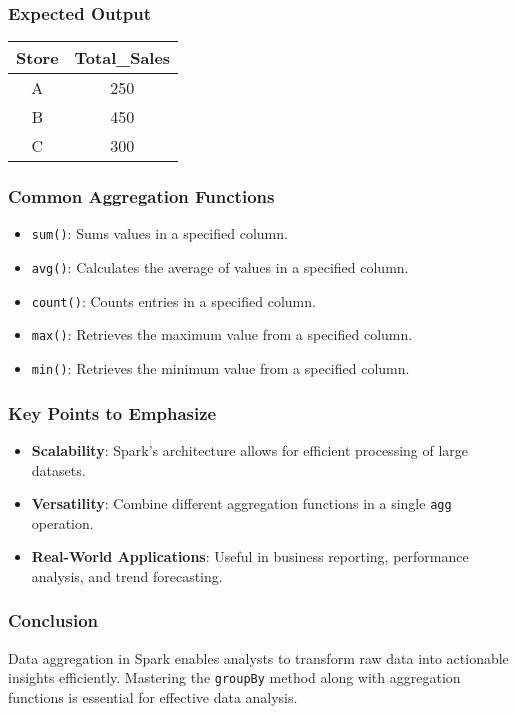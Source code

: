 \documentclass[aspectratio=169]{beamer}
\begin{document}
\begin{frame}
    \frametitle{Expected Output}
    \begin{tabular}{|c|c|}
        \hline
        Store & Total\_Sales \\
        \hline
        A & 250 \\
        B & 450 \\
        C & 300 \\
        \hline
    \end{tabular}
\end{frame}

\begin{frame}
    \frametitle{Common Aggregation Functions}
    \begin{itemize}
        \item \texttt{sum()}: Sums values in a specified column.
        \item \texttt{avg()}: Calculates the average of values in a specified column.
        \item \texttt{count()}: Counts entries in a specified column.
        \item \texttt{max()}: Retrieves the maximum value from a specified column.
        \item \texttt{min()}: Retrieves the minimum value from a specified column.
    \end{itemize}
\end{frame}

\begin{frame}
    \frametitle{Key Points to Emphasize}
    \begin{itemize}
        \item \textbf{Scalability}: Spark’s architecture allows for efficient processing of large datasets.
        \item \textbf{Versatility}: Combine different aggregation functions in a single \texttt{agg} operation.
        \item \textbf{Real-World Applications}: Useful in business reporting, performance analysis, and trend forecasting.
    \end{itemize}
\end{frame}

\begin{frame}
    \frametitle{Conclusion}
    Data aggregation in Spark enables analysts to transform raw data into actionable insights efficiently. Mastering the \texttt{groupBy} method along with aggregation functions is essential for effective data analysis.
\end{frame}
\end{document}
